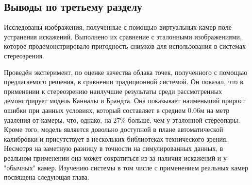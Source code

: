 \subsection{Выводы по третьему разделу}

Исследованы изображения, полученные с помощью виртуальных камер поле устранения искажений. Выполнено их сравнение 
с эталонными изображениями,  которое продемонстрировало пригодность снимков для использования в системах стереозрения.

Проведён эксперимент,
по оценке качества облака точек, полученного с помощью предлагаемого решения, в сравнении  традиционной системой. Он показал, что в применении к стереозрению 
наилучшие результаты среди рассмотренных демонстрирует модель Канналы и Брандта. 
Она показывает наименьший прирост ошибки при данных условиях, который составляет в среднем 0.06м на метр удаления от камеры, что, однако, на 27\% больше, 
чем у эталонной стереопары. Кроме того, модель является довольно доступной в плане автоматической калибровки и присутствует в нескольких библиотеках 
технического зрения. Несмотря на заметную разницу в точности на симулированных данных, в реальном применении она может сократиться из-за наличия искажений
и у "обычных" камер. Изучению системы в том числе с применением реальных камер посвящена следующая глава. 
